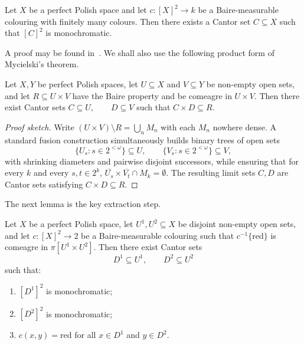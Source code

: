 \begin{fact}[Galvin]\label{fact:galvin}
    Let $X$ be a perfect Polish space and let $c\colon[X]^2\to k$ be a Baire-measurable colouring with finitely many colours.
    Then there exists a Cantor set $C\subseteq X$ such that $[C]^2$ is monochromatic.
\end{fact}
 
A proof may be found in~\cite[Theorem~19.6]{Kechris_1995_DescriptiveSetTheory}.
We shall also use the following product form of Mycielski's theorem.
 
\begin{fact}\label{fact:product_mycielski}
    Let $X,Y$ be perfect Polish spaces, let $U\subseteq X$ and $V\subseteq Y$ be non-empty open sets, and let $R\subseteq U\times V$ have the Baire property and be comeagre in $U\times V$.
    Then there exist Cantor sets $C\subseteq U,\qquad D\subseteq V$ such that $C\times D\subseteq R$.
\end{fact}
 
\begin{proof}[Proof sketch]
    Write $(U\times V)\setminus R=\bigcup_n M_n$ with each $M_n$ nowhere dense.
    A standard fusion construction simultaneously builds binary trees of open sets $$\{U_s:s\in 2^{<\omega}\}\subseteq U,\qquad\{V_s:s\in 2^{<\omega}\}\subseteq V,$$ with shrinking diameters and pairwise disjoint successors, while ensuring that for every $k$ and every $s,t\in 2^k$, $\overline{U_s}\times\overline{V_t}\cap M_k=\emptyset$.
    The resulting limit sets $C,D$ are Cantor sets satisfying $C\times D\subseteq R$.
\end{proof}
 
The next lemma is the key extraction step.
 
\begin{lemma}\label{lemma:joint_extraction}
    Let $X$ be a perfect Polish space, let $U^1,U^2\subseteq X$ be disjoint non-empty open sets, and let $c\colon[X]^2\to 2$ be a Baire-measurable colouring such that $c^{-1}\{\mathrm{red}\}$ is comeagre in $\pi[U^1\times U^2]$.
    Then there exist Cantor sets $$D^1\subseteq U^1,\qquad D^2\subseteq U^2$$ such that:
    \begin{enumerate}[label=\textup{(\roman*)}]
        \item $[D^1]^2$ is monochromatic;
        \item $[D^2]^2$ is monochromatic;
        \item $c(x,y)=\mathrm{red}$ for all $x\in D^1$ and $y\in D^2$.
    \end{enumerate}
\end{lemma}
 
